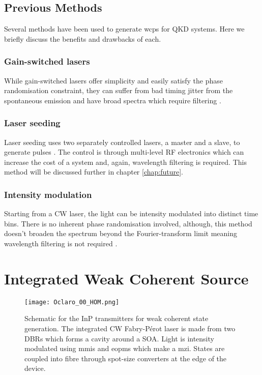 \subsection{Previous Methods}

Several methods have been used to generate \acp{wcp} for \ac{QKD} systems. Here we briefly discuss the benefits and drawbacks of each.

\subsubsection*{Gain-switched lasers}

While gain-switched lasers offer simplicity and easily satisfy the phase randomisation constraint, they can suffer from bad timing jitter from the spontaneous emission and have broad spectra which require filtering \cite{Agnesi2019}.


\subsubsection*{Laser seeding}

Laser seeding uses two separately controlled lasers, a master and a slave, to generate pulses \cite{Comandar2016PLS}. The control is through multi-level RF electronics which can increase the cost of a system and, again, wavelength filtering is required. This method will be discussed further in chapter \ref{chap:future}.


\subsubsection*{Intensity modulation}

Starting from a \ac{CW} laser, the light can be intensity modulated into distinct time bins. There is no inherent phase randomisation involved, although, this method doesn't broaden the spectrum beyond the Fourier-transform limit meaning wavelength filtering is not required \cite{Sibson2017InP}.

\section{Integrated Weak Coherent Source}

\begin{figure}[t]
	\centering
	\texttt{[image: Oclaro\_00\_HOM.png]}
	\caption[Schematic of the integrated transmitters for weak coherent state generation]{Schematic for the \ac{InP} transmitters for weak coherent state generation. The integrated \ac{CW} Fabry-P\'{e}rot laser is made from two \acfp{DBR} which forms a cavity around a \acf{SOA}. Light is intensity modulated using \acfp{mmi} and \acfp{eopm} which make a \acf{mzi}. States are coupled into fibre through spot-size converters at the edge of the device.}
	\label{fig:hom_chip}
\end{figure}


